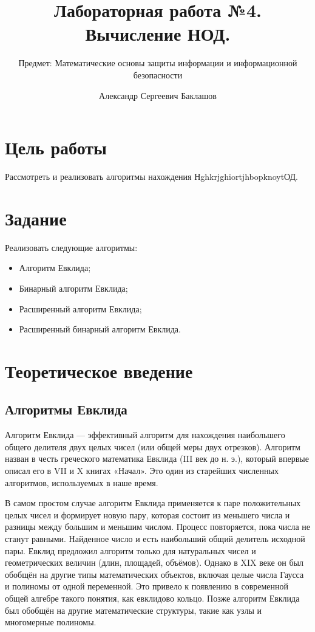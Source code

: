 \documentclass[
  12pt,
  a4paper,
]{scrreprt}
\title{Лабораторная работа №4. Вычисление НОД.}
\subtitle{Предмет: Математические основы защиты информации и
информационной безопасности}
\author{Александр Сергеевич Баклашов}
\date{}
\begin{document}
\maketitle

\renewcommand*\contentsname{Содержание}
{
\setcounter{tocdepth}{2}
\tableofcontents
}
\listoffigures
{}
\chapter{Цель
работы}\label{ux446ux435ux43bux44c-ux440ux430ux431ux43eux442ux44b}

Рассмотреть и реализовать алгоритмы нахождения НghkrjghiortjhbopknoytОД.

\chapter{Задание}\label{ux437ux430ux434ux430ux43dux438ux435}

Реализовать следующие алгоритмы:

\begin{itemize}
\item
  Алгоритм Евклида;
\item
  Бинарный алгоритм Евклида;
\item
  Расширенный алгоритм Евклида;
\item
  Расширенный бинарный алгоритм Евклида.
\end{itemize}

\chapter{Теоретическое
введение}\label{ux442ux435ux43eux440ux435ux442ux438ux447ux435ux441ux43aux43eux435-ux432ux432ux435ux434ux435ux43dux438ux435}

\section{Алгоритмы
Евклида}\label{ux430ux43bux433ux43eux440ux438ux442ux43cux44b-ux435ux432ux43aux43bux438ux434ux430}

Алгоритм Евклида — эффективный алгоритм для нахождения наибольшего
общего делителя двух целых чисел (или общей меры двух отрезков).
Алгоритм назван в честь греческого математика Евклида (III век до н.
э.), который впервые описал его в VII и X книгах «Начал». Это один из
старейших численных алгоритмов, используемых в наше время.

В самом простом случае алгоритм Евклида применяется к паре положительных
целых чисел и формирует новую пару, которая состоит из меньшего числа и
разницы между большим и меньшим числом. Процесс повторяется, пока числа
не станут равными. Найденное число и есть наибольший общий делитель
исходной пары. Евклид предложил алгоритм только для натуральных чисел и
геометрических величин (длин, площадей, объёмов). Однако в XIX веке он
был обобщён на другие типы математических объектов, включая целые числа
Гаусса и полиномы от одной переменной. Это привело к появлению в
современной общей алгебре такого понятия, как евклидово кольцо. Позже
алгоритм Евклида был обобщён на другие математические структуры, такие
как узлы и многомерные полиномы.
\end{document}
